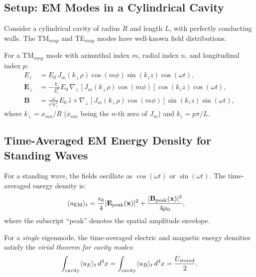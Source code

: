 \documentclass[aps,prd,twocolumn,superscriptaddress,floatfix,nofootinbib]{revtex4-2}
\begin{document}
\subsection{Setup: EM Modes in a Cylindrical Cavity}
\label{sec:cavity-setup}

Consider a cylindrical cavity of radius $R$ and length $L$, with
perfectly conducting walls. The TM$_{mnp}$ and TE$_{mnp}$ modes have
well-known field distributions.

For a TM$_{mnp}$ mode with azimuthal index $m$, radial index $n$,
and longitudinal index $p$:
\begin{align}
E_z &= E_0\,J_m(k_\perp \rho)\cos(m\phi)\sin(k_z z)\cos(\omega t),
\label{eq:TM-Ez}\\
\mathbf{E}_\perp &= -\frac{k_z}{k_\perp^2}E_0\,
\nabla_\perp\!\left[J_m(k_\perp\rho)\cos(m\phi)\right]
\cos(k_z z)\cos(\omega t), \\
\mathbf{B} &= \frac{\omega}{c^2 k_\perp^2}E_0\,
\hat{z}\times\nabla_\perp\!\left[J_m(k_\perp\rho)\cos(m\phi)\right]
\sin(k_z z)\sin(\omega t),
\end{align}
where $k_\perp = x_{mn}/R$ ($x_{mn}$ being the $n$-th zero of $J_m$)
and $k_z = p\pi/L$.

\subsection{Time-Averaged EM Energy Density for Standing Waves}
\label{sec:standing-wave-energy}

For a standing wave, the fields oscillate as $\cos(\omega t)$ or
$\sin(\omega t)$. The time-averaged energy density is:
\begin{align}
\langle u_{\rm EM}\rangle_t
&= \frac{\epsilon_0}{4}|\mathbf{E}_{\rm peak}(\mathbf{x})|^2
+ \frac{|\mathbf{B}_{\rm peak}(\mathbf{x})|^2}{4\mu_0},
\label{eq:time-avg-uEM}
\end{align}
where the subscript ``peak'' denotes the spatial amplitude envelope.

For a \emph{single} eigenmode, the time-averaged electric and magnetic
energy densities satisfy the \emph{virial theorem for cavity modes}:
\begin{equation}
\int_{\rm cavity}\langle u_E\rangle_t\,d^3x
= \int_{\rm cavity}\langle u_B\rangle_t\,d^3x
= \frac{U_{\rm stored}}{2}.
\label{eq:virial}
\end{equation}
\end{document}
